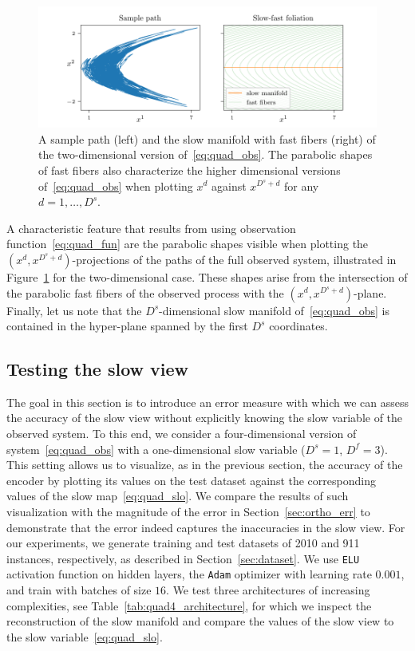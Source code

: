 \documentclass{article}
\begin{document}
\begin{figure}
    \centering
    \includegraphics[width=\textwidth]{figs/quad1-1_path.pdf}
    \caption{A sample path (left) and the slow manifold with fast fibers (right) of the two-dimensional version of~\eqref{eq:quad_obs}. The parabolic shapes of fast fibers also characterize the higher dimensional versions of~\eqref{eq:quad_obs} when plotting $x^d$ against $x^{D^s+d}$ for any $d=1,\dotsc,D^s$.}
    \label{fig:quad1-1_path}
\end{figure}

A characteristic feature that results from using observation function~\eqref{eq:quad_fun} are the parabolic shapes visible when plotting the $(x^d,x^{D^s+d})$-projections of the paths of the full observed system, illustrated in Figure~\ref{fig:quad1-1_path} for the two-dimensional case. These shapes arise from the intersection of the parabolic fast fibers of the observed process with the $(x^d,x^{D^s+d})$-plane. Finally, let us note that the $D^s$-dimensional slow manifold of~\eqref{eq:quad_obs} is contained in the hyper-plane spanned by the first $D^s$ coordinates.

\subsection{Testing the slow view}\label{sec:test_error}
The goal in this section is to introduce an error measure with which we can assess the accuracy of the slow view without explicitly knowing the slow variable of the observed system. To this end, we consider a four-dimensional version of system~\eqref{eq:quad_obs} with a one-dimensional slow variable ($D^s=1$, $D^f=3$). This setting allows us to visualize, as in the previous section, the accuracy of the encoder by plotting its values on the test dataset against the corresponding values of the slow map~\eqref{eq:quad_slo}. We compare the results of such visualization with the magnitude of the error in Section~\ref{sec:ortho_err} to demonstrate that the error indeed captures the inaccuracies in the slow view. For our experiments, we generate training and test datasets of 2010 and 911 instances, respectively, as described in Section~\ref{sec:dataset}. We use \texttt{ELU} activation function on hidden layers, the \texttt{Adam} optimizer with learning rate $0.001$, and train with batches of size $16$. We test three architectures of increasing complexities, see Table~\ref{tab:quad4_architecture}, for which we inspect the reconstruction of the slow manifold and compare the values of the slow view to the slow variable~\eqref{eq:quad_slo}.
\end{document}
